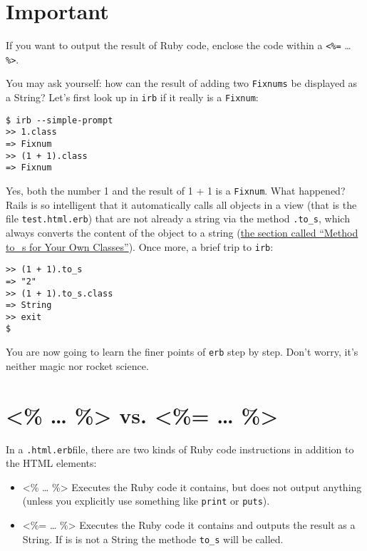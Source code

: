 \documentclass[a4paper]{book}
\begin{document}
\section{Important}\label{important-5}

If you want to output the result of Ruby code, enclose the code within a \texttt{\textless{}\%=} \ldots{} \texttt{\%\textgreater{}}.

You may ask yourself: how can the result of adding two \texttt{Fixnums} be displayed as a String? Let's first look up in \texttt{irb} if it really is a \texttt{Fixnum}:

\begin{shaded}\begin{verbatim}
$ irb --simple-prompt
>> 1.class
=> Fixnum
>> (1 + 1).class
=> Fixnum
\end{verbatim}\end{shaded}

Yes, both the number 1 and the result of 1 + 1 is a \texttt{Fixnum}. What happened? Rails is so intelligent that it automatically calls all objects in a view (that is the file \texttt{test.html.erb}) that are not already a string via the method \texttt{.to\_s}, which always converts the content of the object to a string (\hyperref[ruby-toux5fs]{the section called “Method to\_s for Your Own Classes”}). Once more, a brief trip to \texttt{irb}:

\begin{shaded}\begin{verbatim}
>> (1 + 1).to_s
=> "2"
>> (1 + 1).to_s.class
=> String
>> exit
$
\end{verbatim}\end{shaded}

You are now going to learn the finer points of \texttt{erb} step by step. Don't worry, it's neither magic nor rocket science.

\section{\textless{}\% \ldots{} \%\textgreater{} vs. \textless{}\%= \ldots{} \%\textgreater{}}\label{vs.}

In a \texttt{.html.erb}file, there are two kinds of Ruby code instructions in addition to the HTML elements:

\begin{itemize}
\itemsep1pt\parskip0pt
\item
  \textless{}\% \ldots{} \%\textgreater{} Executes the Ruby code it contains, but does not output anything (unless you explicitly use something like \texttt{print} or \texttt{puts}).
\item
  \textless{}\%= \ldots{} \%\textgreater{} Executes the Ruby code it contains and outputs the result as a String. If is is not a String the methode \texttt{to\_s} will be called.
\end{itemize}
\end{document}
